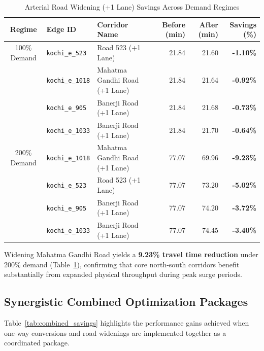 \documentclass[12pt,a4paper]{report}
\begin{document}
\begin{table}[H]
\centering
\caption{Arterial Road Widening (+1 Lane) Savings Across Demand Regimes}
\label{tab:widening_savings}
\vspace{0.15cm}
\small
\begin{tabularx}{\textwidth}{clXrrr}
\toprule
\textbf{Regime} & \textbf{Edge ID} & \textbf{Corridor Name} & \textbf{Before (min)} & \textbf{After (min)} & \textbf{Savings (\%)} \\
\midrule
100\% Demand & \texttt{kochi\_e\_523}  & Road 523 (+1 Lane) & 21.84 & 21.60 & \textbf{-1.10\%} \\
             & \texttt{kochi\_e\_1018} & Mahatma Gandhi Road (+1 Lane) & 21.84 & 21.64 & \textbf{-0.92\%} \\
             & \texttt{kochi\_e\_905}  & Banerji Road (+1 Lane) & 21.84 & 21.68 & \textbf{-0.73\%} \\
             & \texttt{kochi\_e\_1033} & Banerji Road (+1 Lane) & 21.84 & 21.70 & \textbf{-0.64\%} \\
\midrule
200\% Demand & \texttt{kochi\_e\_1018} & Mahatma Gandhi Road (+1 Lane) & 77.07 & 69.96 & \textbf{-9.23\%} \\
             & \texttt{kochi\_e\_523}  & Road 523 (+1 Lane) & 77.07 & 73.20 & \textbf{-5.02\%} \\
             & \texttt{kochi\_e\_905}  & Banerji Road (+1 Lane) & 77.07 & 74.20 & \textbf{-3.72\%} \\
             & \texttt{kochi\_e\_1033} & Banerji Road (+1 Lane) & 77.07 & 74.45 & \textbf{-3.40\%} \\
\bottomrule
\end{tabularx}
\end{table}

Widening Mahatma Gandhi Road yields a \textbf{9.23\% travel time reduction} under 200\% demand (Table~\ref{tab:widening_savings}), confirming that core north-south corridors benefit substantially from expanded physical throughput during peak surge periods.

\subsection*{Synergistic Combined Optimization Packages}
Table~\ref{tab:combined_savings} highlights the performance gains achieved when one-way conversions and road widenings are implemented together as a coordinated package.
\end{document}
